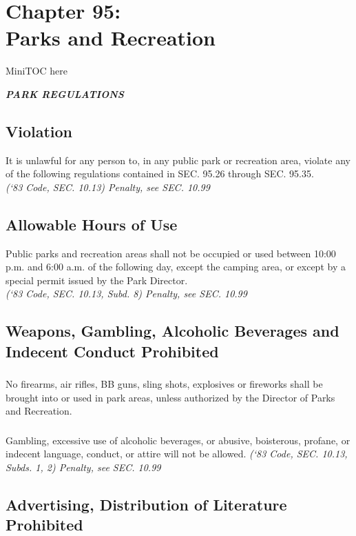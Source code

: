 
%
\chapter*{Chapter 95: \\
	Parks and Recreation}

MiniTOC here
\pagebreak

\begin{center}
\emph{\textbf{\LARGE{PARK REGULATIONS}}}
\end{center}
\setcounter{section}{24}
\section{Violation}
It is unlawful for any person to, in any public park or recreation area, violate any of the following regulations contained in SEC. 95.26 through SEC. 95.35.\\
\emph{(‘83 Code, SEC. 10.13)  Penalty, see SEC. 10.99}
\section{Allowable Hours of Use}
Public parks and recreation areas shall not be occupied or used between 10:00 p.m. and 6:00 a.m. of the following day, except the camping area, or except by a special permit issued by the Park Director.\\
\emph{(‘83 Code, SEC. 10.13, Subd. 8) Penalty, see SEC. 10.99}
\section{Weapons, Gambling, Alcoholic Beverages and Indecent Conduct Prohibited}
\subsection{}
No firearms, air rifles, BB guns, sling shots, explosives or fireworks shall be brought into or used in park areas, unless authorized by the Director of Parks and Recreation.
\subsection{}
Gambling, excessive use of alcoholic beverages, or abusive, boisterous, profane, or indecent language, conduct, or attire will not be allowed.
\emph{(‘83 Code, SEC. 10.13, Subds. 1, 2)  Penalty, see SEC. 10.99}
\section{Advertising, Distribution of Literature Prohibited}
